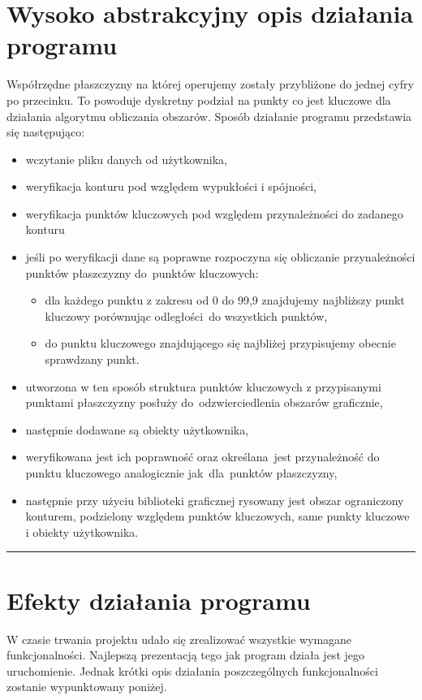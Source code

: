 \documentclass[a4paper,11pt]{article}
\newcommand{\linia}{\rule{\linewidth}{0.4mm}}
\begin{document}
\section{Wysoko abstrakcyjny opis działania programu}
Współrzędne płaszczyzny na której operujemy zostały przybliżone do jednej cyfry po przecinku. To powoduje dyskretny podział na punkty co jest kluczowe dla działania algorytmu obliczania obszarów.
Sposób działanie programu przedstawia się następująco:
\begin{itemize}
\item  wczytanie pliku danych od użytkownika,
\item  weryfikacja konturu pod względem wypukłości i spójności,
\item  weryfikacja punktów kluczowych pod względem przynależności do zadanego konturu
\item jeśli po weryfikacji dane są poprawne rozpoczyna się obliczanie przynależności punktów płaszczyzny do~punktów kluczowych:
\begin{itemize}
\item dla każdego punktu z zakresu od 0 do 99,9 znajdujemy najbliższy  punkt kluczowy porównując odległości~do wszystkich punktów,
\item do punktu kluczowego znajdującego się najbliżej przypisujemy obecnie sprawdzany punkt.
\end{itemize}
\item utworzona w ten sposób struktura punktów kluczowych z przypisanymi punktami płaszczyzny posłuży do~odzwierciedlenia obszarów graficznie,
\item następnie dodawane są obiekty użytkownika,
\item weryfikowana jest ich poprawność oraz określana~jest przynależność do punktu kluczowego analogicznie jak~dla~punktów płaszczyzny,
\item następnie przy użyciu biblioteki graficznej rysowany jest obszar ograniczony konturem, podzielony względem punktów kluczowych, same punkty kluczowe i obiekty użytkownika.
\end{itemize}


\noindent\linia
\section{Efekty działania programu}
W czasie trwania projektu udało się zrealizować wszystkie wymagane funkcjonalności. Najlepszą prezentacją tego jak program działa jest jego uruchomienie. Jednak krótki opis działania poszczególnych funkcjonalności zostanie wypunktowany poniżej.
\end{document}
